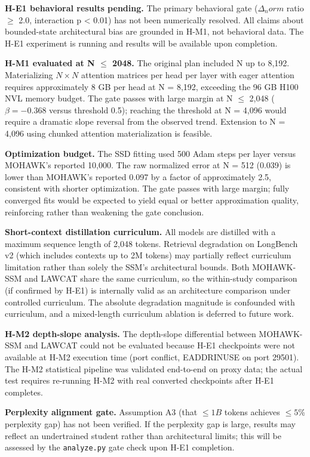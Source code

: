 \textbf{H-E1 behavioral results pending.} The primary behavioral gate ($\Delta _norm$ ratio $\geq$ 2.0, interaction p < 0.01) has not been numerically resolved. All claims about bounded-state architectural bias are grounded in H-M1, not behavioral data. The H-E1 experiment is running and results will be available upon completion.

\textbf{H-M1 evaluated at N $\leq$ 2048.} The original plan included N up to 8,192. Materializing $N\times N$ attention matrices per head per layer with eager attention requires approximately 8 GB per head at N = 8,192, exceeding the 96 GB H100 NVL memory budget. The gate passes with large margin at N $\leq$ 2,048 ($\beta = -0.368$ versus threshold 0.5); reaching the threshold at N = 4,096 would require a dramatic slope reversal from the observed trend. Extension to N = 4,096 using chunked attention materialization is feasible.

\textbf{Optimization budget.} The SSD fitting used 500 Adam steps per layer versus MOHAWK's reported 10,000. The raw normalized error at N = 512 (0.039) is lower than MOHAWK's reported 0.097 by a factor of approximately 2.5, consistent with shorter optimization. The gate passes with large margin; fully converged fits would be expected to yield equal or better approximation quality, reinforcing rather than weakening the gate conclusion.

\textbf{Short-context distillation curriculum.} All models are distilled with a maximum sequence length of 2,048 tokens. Retrieval degradation on LongBench v2 (which includes contexts up to 2M tokens) may partially reflect curriculum limitation rather than solely the SSM's architectural bounds. Both MOHAWK-SSM and LAWCAT share the same curriculum, so the within-study comparison (if confirmed by H-E1) is internally valid as an architecture comparison under controlled curriculum. The absolute degradation magnitude is confounded with curriculum, and a mixed-length curriculum ablation is deferred to future work.

\textbf{H-M2 depth-slope analysis.} The depth-slope differential between MOHAWK-SSM and LAWCAT could not be evaluated because H-E1 checkpoints were not available at H-M2 execution time (port conflict, EADDRINUSE on port 29501). The H-M2 statistical pipeline was validated end-to-end on proxy data; the actual test requires re-running H-M2 with real converted checkpoints after H-E1 completes.

\textbf{Perplexity alignment gate.} Assumption A3 (that $\leq 1B$ tokens achieves $\leq 5$\% perplexity gap) has not been verified. If the perplexity gap is large, results may reflect an undertrained student rather than architectural limits; this will be assessed by the \texttt{analyze.py} gate check upon H-E1 completion.

